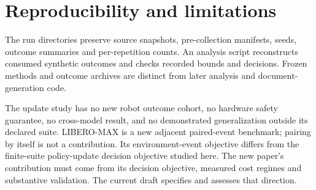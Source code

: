 \documentclass[conference]{IEEEtran}
\begin{document}
\section{Reproducibility and limitations}

The run directories preserve source snapshots, pre-collection manifests, seeds, outcome summaries and per-repetition counts. An analysis script reconstructs consumed synthetic outcomes and checks recorded bounds and decisions. Frozen methods and outcome archives are distinct from later analysis and document-generation code.

The update study has no new robot outcome cohort, no hardware safety guarantee, no cross-model result, and no demonstrated generalization outside its declared suite. LIBERO-MAX \cite{max} is a new adjacent paired-event benchmark; pairing by itself is not a contribution. Its environment-event objective differs from the finite-suite policy-update decision objective studied here. The new paper's contribution must come from its decision objective, measured cost regimes and substantive validation. The current draft specifies and assesses that direction.

\clearpage


\end{document}
